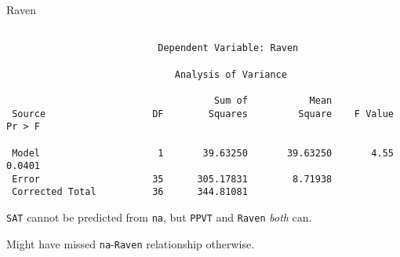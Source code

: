 \begin{frame}[fragile]{Raven}

{\scriptsize
\begin{verbatim}

                           Dependent Variable: Raven 

                              Analysis of Variance
 
                                     Sum of           Mean
 Source                   DF        Squares         Square    F Value    Pr > F

 Model                     1       39.63250       39.63250       4.55    0.0401
 Error                    35      305.17831        8.71938                     
 Corrected Total          36      344.81081                                    
\end{verbatim}
}

\texttt{SAT} cannot be predicted from \texttt{na}, but \texttt{PPVT}
and \texttt{Raven} \emph{both} can. 

Might have missed \texttt{na}-\texttt{Raven} relationship otherwise.
  
\end{frame}
